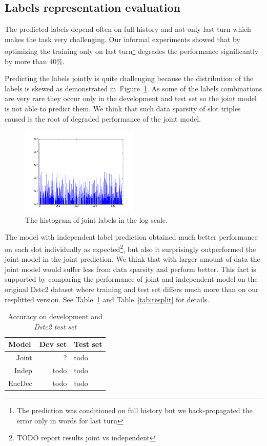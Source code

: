 \documentclass{itatnew}
\begin{document}
\subsection{Labels representation evaluation}
\label{sec:eval}
The predicted labels depend often on full history and not only last turn which makes the task very challenging.
Our informal experiments showed that by optimizing the training only on last turn\footnote{The prediction was conditioned on full history but we back-propagated the error only in words for last turn} degrades the performance significantly by more than 40\%. 

Predicting the labels jointly is quite challenging because the distribution of the labels is skewed as demonstrated in~Figure~\ref{fig:labels}.
As some of the labels combinations are very rare they occur only in the development and test set so the joint model is not able to predict them.
We think that such data sparsity of slot triples caused is the root of degraded performance of the joint model.
\begin{figure}
\includegraphics[width=0.5\textwidth]{dstc2_goals_joint_log_scale}
\caption{The histogram of joint labels in the log scale.}
\label{fig:labels}
\end{figure}

The model with independent label prediction obtained much better performance on each slot individually as expected\footnote{TODO report results joint vs independent}, but also it surprisingly outperformed the joint model in the joint prediction.
We think that with larger amount of data the joint model would suffer less from data sparsity and perform better.
This fact is supported by comparing the performance of joint and independent model on the original Dstc2 dataset where training and test set differs much more than on our resplitted version. 
See Table~\ref{tab:dstc} and Table~\ref{tab:resplit} for details.

\begin{table}
\caption{Accuracy on development and {\it Dstc2 test set }}
\begin{center}
\begin{tabular}{r@{\quad}rll}
\hline
\multicolumn{1}{l}{\rule{0pt}{12pt}
                   Model}&\multicolumn{1}{l}{Dev set}&\multicolumn{2}{l}{Test set}\\[2pt]
\hline\rule{0pt}{12pt}
Joint  &     ?&  todo \\
Indep  &   todo& todo \\
EncDec &   todo& todo \\
\hline
\end{tabular}
\end{center}
\label{tab:dstc}
\end{table}
\end{document}
